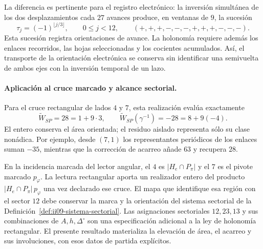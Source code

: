 La diferencia es pertinente para el registro electrónico: la inversión
simultánea de los dos desplazamientos cada $27$ avances produce, en
ventanas de $9$, la sucesión
\[
 \tau_j=(-1)^{\lfloor j/3\rfloor},\qquad 0\leq j<12,
 \qquad (+,+,+,-,-,-,+,+,+,-,-,-).
\]
Esta sucesión registra orientaciones de avance. La holonomía requiere
además los enlaces recorridos, las hojas seleccionadas y los cocientes
acumulados. Así, el transporte de la orientación electrónica se conserva
sin identificar una semivuelta de ambos ejes con la inversión temporal
de un lazo.

\paragraph{Aplicación al cruce marcado y alcance sectorial.}
Para el cruce rectangular de lados $4$ y $7$, esta realización evalúa
exactamente
\[
 \widetilde W_{SP}=28=1+9\cdot3,\qquad
 \widetilde W_{SP}(\gamma^{-1})=-28=8+9(-4).
\]
El entero conserva el área orientada; el residuo aislado representa sólo
su clase nonádica. Por ejemplo, desde $(7,1)$ los representantes
periódicos de los enlaces suman $-35$, mientras que la corrección de
acarreo añade $63$ y recupera $28$.

En la incidencia marcada del lector angular, el $4$ es
$|H_e\cap P_\pi|$ y el $7$ es el pivote marcado $p_\varphi$.
La lectura rectangular aporta un realizador entero del producto
$|H_e\cap P_\pi|\,p_\varphi$ una vez declarado ese cruce. El
mapa que identifique esa región con el sector $12$ debe conservar
la marca y la orientación del sistema sectorial de
la Definición~\ref{def:ii09-sistema-sectorial}. Las asignaciones
sectoriales $12,23,13$ y sus combinaciones de $A,h,\Delta^\circ$
son una especificación adicional a la ley de holonomía rectangular.
El presente resultado materializa la elevación de área, el acarreo y
sus involuciones, con esos datos de partida explícitos.
